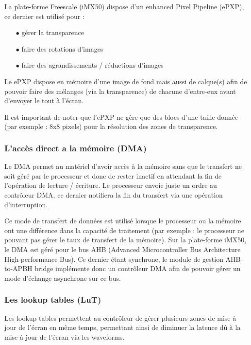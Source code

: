 La plate-forme Freescale (iMX50) dispose d'un enhanced Pixel Pipeline (ePXP), ce dernier est utilisé pour : 
	\begin{itemize}
		\item[$\bullet$] gérer la transparence
		\item[$\bullet$] faire des rotations d'images
		\item[$\bullet$] faire des agrandissements / réductions d'images\\
	\end{itemize}

Le ePXP dispose en mémoire d'une image de fond mais aussi de calque(s) afin de pouvoir faire des 
mélanges (via la transparence) de chacune d'entre-eux avant d'envoyer le tout à l'écran.

Il est important de noter que l'ePXP ne gère que des blocs d'une taille donnée (par exemple : 8x8 pixels) pour la résolution des zones de transparence.

\subsubsection{L'accès direct a la mémoire (DMA)}

Le DMA permet au matériel d'avoir accès à la mémoire sans que le transfert ne soit géré par le processeur et donc de rester inactif en attendant la fin de l'opération de lecture / écriture.
Le processeur envoie juste un ordre au contrôleur DMA, ce dernier notifiera la fin du transfert via une opération d'interruption.

Ce mode de transfert de données est utilisé lorsque le processeur ou la mémoire ont une différence dans la capacité de traitement (par exemple : le processeur ne pouvant pas gérer le taux de transfert de la mémoire).
Sur la plate-forme iMX50, le DMA est géré pour le bus AHB (Advanced Microcontroller Bus Architecture High-performance Bus). Ce dernier étant synchrone, le module de gestion AHB-to-APBH bridge implémente donc un contrôleur DMA afin de pouvoir gérer un mode d'échange asynchrone sur ce bus.

\subsubsection{Les lookup tables (LuT)}

Les lookup tables permettent au contrôleur de gérer plusieurs zones de mise à jour de l'écran en même temps, permettant ainsi de diminuer la latence dû à la mise à jour de l'écran via les waveforms.

